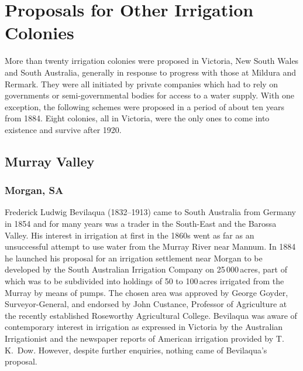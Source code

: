 
\setcounter{endnote}{0}

\chapter{Proposals for Other Irrigation Colonies}
\label{ch:proposals}


More than twenty irrigation colonies were proposed in Victoria, New
South Wales and South Australia, generally in response to progress
with those at Mildura and Rermark.  They were all initiated by private
companies which had to rely on governments or semi-governmental bodies
for access to a water supply. With one exception, the following
schemes were proposed in a period of about ten years from 1884.  Eight
colonies, all in Victoria, were the only ones to come into existence
and survive after 1920.

\section*{Murray Valley}

\subsection*{Morgan, SA} 

Frederick Ludwig Bevilaqua (1832--1913)  came
to South Australia from Germany in 1854 and for many years was a
trader in the South-East and the Barossa Valley.  His interest in irrigation at first in the 1860s went as
far as an unsuccessful attempt to use water from the Murray River
 near Mannum.  In 1884 he
launched his proposal for an irrigation settlement near Morgan to be
developed by the South Australian Irrigation Company
 on 25\,000\,acres, part of which was to
be subdivided into holdings of 50 to 100\,acres irrigated from the
Murray by means of pumps.  The chosen area was approved by George
Goyder, Surveyor-General,   and endorsed by John
Custance,  Professor of Agriculture at the recently
established Roseworthy Agricultural College. 
 Bevilaqua was aware of
contemporary interest in irrigation as expressed in Victoria by the
Australian Irrigationist and the newspaper reports of American
irrigation provided by T.\,K.~Dow.  However,
despite further enquiries, nothing came of Bevilaqua's
proposal.

